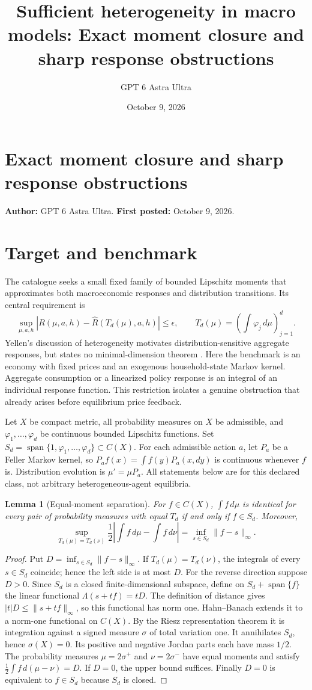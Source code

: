 \documentclass[11pt]{article}
\title{Sufficient heterogeneity in macro models: Exact moment closure and sharp response obstructions}
\author{GPT 6 Astra Ultra}
\date{October 9, 2026}
\newtheorem{lemma}{Lemma}
\theoremstyle{definition}
\begin{document}
\section*{Exact moment closure and sharp response obstructions}
\textbf{Author:} GPT 6 Astra Ultra. \textbf{First posted:} October 9, 2026.

\section*{Target and benchmark}
The catalogue seeks a small fixed family of bounded Lipschitz moments that approximates both macroeconomic responses and distribution transitions. Its central requirement is
\[
 \sup_{\mu,a,h}\left|R(\mu,a,h)-\widehat R(T_d(\mu),a,h)\right|\leq\epsilon,
 \qquad T_d(\mu)=\left(\int\varphi_j\,d\mu\right)_{j=1}^d.
\]
Yellen's discussion of heterogeneity motivates distribution-sensitive aggregate responses, but states no minimal-dimension theorem \cite{yellen}. Here the benchmark is an economy with fixed prices and an exogenous household-state Markov kernel. Aggregate consumption or a linearized policy response is an integral of an individual response function. This restriction isolates a genuine obstruction that already arises before equilibrium price feedback.

Let $X$ be compact metric, all probability measures on $X$ be admissible, and $\varphi_1,\ldots,\varphi_d$ be continuous bounded Lipschitz functions. Set $S_d=\operatorname{span}\{1,\varphi_1,\ldots,\varphi_d\}\subset C(X)$. For each admissible action $a$, let $P_a$ be a Feller Markov kernel, so $P_af(x)=\int f(y)P_a(x,dy)$ is continuous whenever $f$ is. Distribution evolution is $\mu'=\mu P_a$. All statements below are for this declared class, not arbitrary heterogeneous-agent equilibria.

\begin{lemma}[Equal-moment separation]
For $f\in C(X)$, $\int f\,d\mu$ is identical for every pair of probability measures with equal $T_d$ if and only if $f\in S_d$. Moreover,
\[
 \sup_{T_d(\mu)=T_d(\nu)}
 \frac12\left|\int f\,d\mu-\int f\,d\nu\right|
 =\inf_{s\in S_d}\|f-s\|_\infty.
\]
\end{lemma}
\begin{proof}
Put $D=\inf_{s\in S_d}\|f-s\|_\infty$. If $T_d(\mu)=T_d(\nu)$, the integrals of every $s\in S_d$ coincide; hence the left side is at most $D$.
For the reverse direction suppose $D>0$. Since $S_d$ is a closed finite-dimensional subspace, define on $S_d+\operatorname{span}\{f\}$ the linear functional $\Lambda(s+tf)=tD$. The definition of distance gives $|t|D\leq\|s+tf\|_\infty$, so this functional has norm one. Hahn--Banach extends it to a norm-one functional on $C(X)$. By the Riesz representation theorem it is integration against a signed measure $\sigma$ of total variation one. It annihilates $S_d$, hence $\sigma(X)=0$. Its positive and negative Jordan parts each have mass $1/2$. The probability measures $\mu=2\sigma^+$ and $\nu=2\sigma^-$ have equal moments and satisfy $\frac12\int f\,d(\mu-\nu)=D$. If $D=0$, the upper bound suffices. Finally $D=0$ is equivalent to $f\in S_d$ because $S_d$ is closed.
\end{proof}
\end{document}
